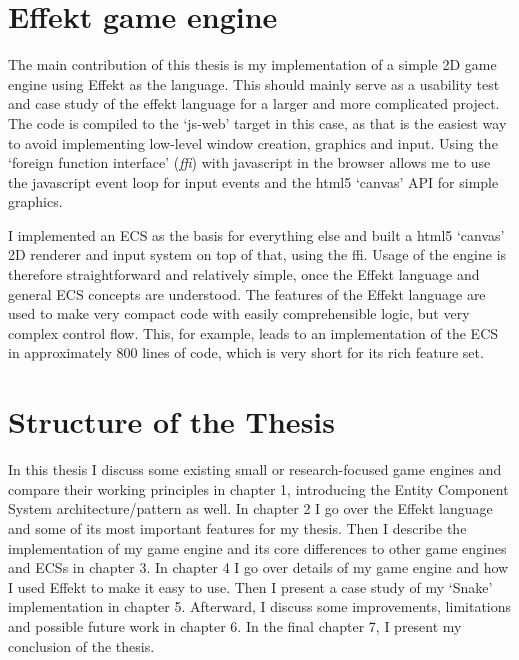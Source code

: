 \section{Effekt game engine}

The main contribution of this thesis is my implementation of a simple 2D game engine using Effekt as the language. This should mainly serve as a usability test and case study of the effekt language for a larger and more complicated project. The code is compiled to the `js-web' target in this case, as that is the easiest way to avoid implementing low-level window creation, graphics and input. Using the `foreign function interface' (\textit{ffi}) with javascript in the browser allows me to use the javascript event loop for input events and the html5 `canvas' API for simple graphics.

I implemented an ECS as the basis for everything else and built a html5 `canvas' 2D renderer and input system on top of that, using the ffi. Usage of the engine is therefore straightforward and relatively simple, once the Effekt language and general ECS concepts are understood. The features of the Effekt language are used to make very compact code with easily comprehensible logic, but very complex control flow. This, for example, leads to an implementation of the ECS in approximately 800 lines of code, which is very short for its rich feature set.

\section{Structure of the Thesis}

In this thesis I discuss some existing small or research-focused game engines and compare their working principles in chapter 1, introducing the Entity Component System architecture/pattern as well. In chapter 2 I go over the Effekt language and some of its most important features for my thesis. Then I describe the implementation of my game engine and its core differences to other game engines and ECSs in chapter 3. In chapter 4 I go over details of my game engine and how I used Effekt to make it easy to use. Then I present a case study of my `Snake' implementation in chapter 5. Afterward, I discuss some improvements, limitations and possible future work in chapter 6. In the final chapter 7, I present my conclusion of the thesis.
